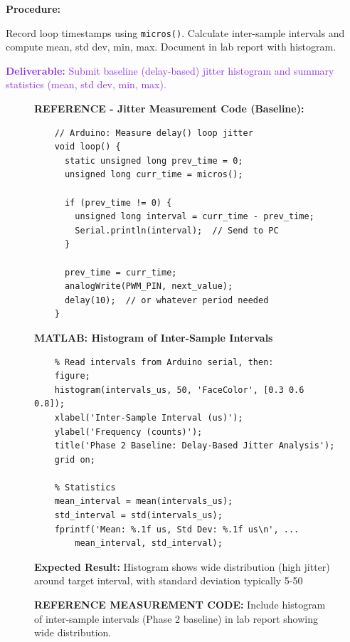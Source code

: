 \documentclass[11pt,letterpaper]{article}
\providecommand{\delECE}[1]{\textcolor{BlueViolet}{\textbf{Deliverable:} #1}}
\begin{document}
\textbf{Procedure:}

Record loop timestamps using \texttt{micros()}. Calculate inter-sample intervals and compute mean, std dev, min, max. Document in lab report with histogram.

\delECE{Submit baseline (delay-based) jitter histogram and summary statistics (mean, std dev, min, max).}

\begin{figure}[H]
    \centering
    \vspace{0.5in}
    \textbf{REFERENCE - Jitter Measurement Code (Baseline):}
    
    \begin{verbatim}
    // Arduino: Measure delay() loop jitter
    void loop() {
      static unsigned long prev_time = 0;
      unsigned long curr_time = micros();
      
      if (prev_time != 0) {
        unsigned long interval = curr_time - prev_time;
        Serial.println(interval);  // Send to PC
      }
      
      prev_time = curr_time;
      analogWrite(PWM_PIN, next_value);
      delay(10);  // or whatever period needed
    }
    \end{verbatim}
    
    \vspace{0.3in}
    \textbf{MATLAB: Histogram of Inter-Sample Intervals}
    
    \begin{verbatim}
    % Read intervals from Arduino serial, then:
    figure;
    histogram(intervals_us, 50, 'FaceColor', [0.3 0.6 0.8]);
    xlabel('Inter-Sample Interval (us)');
    ylabel('Frequency (counts)');
    title('Phase 2 Baseline: Delay-Based Jitter Analysis');
    grid on;
    
    % Statistics
    mean_interval = mean(intervals_us);
    std_interval = std(intervals_us);
    fprintf('Mean: %.1f us, Std Dev: %.1f us\n', ...
        mean_interval, std_interval);
    \end{verbatim}
    
    \vspace{0.3in}
    \textbf{Expected Result:} Histogram shows wide distribution (high jitter) around target interval, with standard deviation typically 5-50%
    
    \vspace{0.3in}
    \caption{\textbf{REFERENCE MEASUREMENT CODE:} Include histogram of inter-sample intervals (Phase 2 baseline) in lab report showing wide distribution.}
    \label{fig:jitter_baseline}
\end{figure}
\end{document}
